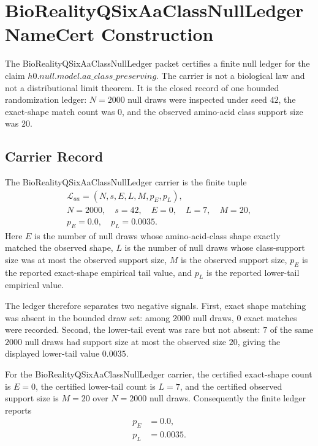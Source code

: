 \chapter{BioRealityQSixAaClassNullLedger NameCert Construction}
\label{ch:concrete-instances-bioreality-q-six-aa-class-null-ledger-namecert}

The BioRealityQSixAaClassNullLedger packet certifies a finite null ledger for the claim $h0.null.model.aa\_class\_preserving$.  The carrier is not a biological law and not a distributional limit theorem.  It is the closed record of one bounded randomization ledger: $N=2000$ null draws were inspected under seed $42$, the exact-shape match count was $0$, and the observed amino-acid class support size was $20$.

\section{Carrier Record}
\label{sec:bioreality-q-six-aa-class-null-ledger-carrier-record}

\begin{definition}
\label{def:bioreality-q-six-aa-class-null-ledger-carrier}
The BioRealityQSixAaClassNullLedger carrier is the finite tuple
$$
\begin{gathered}
\mathcal{L}_{aa}=(N,s,E,L,M,p_E,p_L),\\
N=2000,\quad s=42,\quad E=0,\quad L=7,\quad M=20,\\
p_E=0.0,\quad p_L=0.0035.
\end{gathered}
$$
Here $E$ is the number of null draws whose amino-acid-class shape exactly matched the observed shape, $L$ is the number of null draws whose class-support size was at most the observed support size, $M$ is the observed support size, $p_E$ is the reported exact-shape empirical tail value, and $p_L$ is the reported lower-tail empirical value.
\end{definition}

The ledger therefore separates two negative signals.  First, exact shape matching was absent in the bounded draw set: among $2000$ null draws, $0$ exact matches were recorded.  Second, the lower-tail event was rare but not absent: $7$ of the same $2000$ null draws had support size at most the observed size $20$, giving the displayed lower-tail value $0.0035$.

\begin{theorem}
\label{thm:bioreality-q-six-aa-class-null-ledger-certificate}
For the BioRealityQSixAaClassNullLedger carrier, the certified exact-shape count is $E=0$, the certified lower-tail count is $L=7$, and the certified observed support size is $M=20$ over $N=2000$ null draws.  Consequently the finite ledger reports
$$
\begin{aligned}
p_E &= 0.0,\\
p_L &= 0.0035.
\end{aligned}
$$
\end{theorem}

